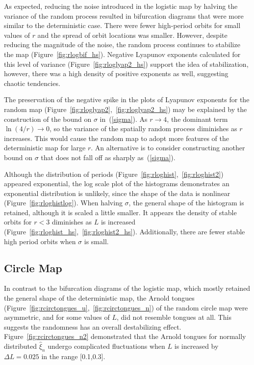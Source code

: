 As expected, reducing the noise introduced in the logistic
map by halving the variance of the random process resulted in
bifurcation diagrams that were more similar to the deterministic
case. There were fewer high-period orbits for small values of $r$ and the spread of orbit
locations was smaller. However, despite reducing
the magnitude of the noise, the random process continues to stabilize
the map (Figure~\ref{fig:rlogbif_hs}). Negative Lyapunov exponents calculated
for this level of variance (Figure~\ref{fig:rloglyap2_hs}) support the
idea of stabilization, however, there was a high density of positive
exponents as well, suggesting chaotic tendencies.

The preservation of the negative spike in the plots of Lyapunov
exponents for the random map
(Figure~\ref{fig:rloglyap2},~\ref{fig:rloglyap2_hs}) may be explained
by the construction of the bound on $\sigma$ in~(\ref{sigma}). As $r \to 4$, the
dominant term $\ln(4/r)
\to 0$, so the variance of the spatially random process diminishes as
$r$ increases. This would cause the random map to adopt more features
of the deterministic map for large $r$. An alternative is to consider constructing
another bound on $\sigma$ that does not fall off as sharply as~(\ref{sigma}).

Although the distribution of periods (Figure~\ref{fig:rloghist},~\ref{fig:rloghist2})
appeared exponential, the log scale plot of the histograms
demonstrates an exponential distribution is unlikely, since the shape
of the data is nonlinear (Figure~\ref{fig:rloghistlog}). When halving
$\sigma$, the general shape of the histogram is retained, although it is scaled a
little smaller. It appears the density of
stable orbits for $r<3$ diminishes as $L$ is increased (Figure~\ref{fig:rloghist_hs},~\ref{fig:rloghist2_hs}). Additionally,
there are fewer stable high period orbits when $\sigma$ is small. 
\subsection{Circle Map}
In contrast to the bifurcation diagrams of the logistic map, which
mostly retained the general shape of the deterministic map, the
Arnold tongues (Figure~\ref{fig:rcirctongues_u},~\ref{fig:rcirctongues_n}) of the
random circle map were asymmetric, and for some values of $L$, did not
resemble tongues at all. This suggests the randomness has an overall
destabilizing effect. Figure~\ref{fig:rcirctongues_n2} demonstrated
that the Arnold tongues for normally distributed $\hat{\xi}_n$ undergo
complicated fluctuations when $L$ is increased by $\Delta L=0.025$ in the range [0.1,0.3].


